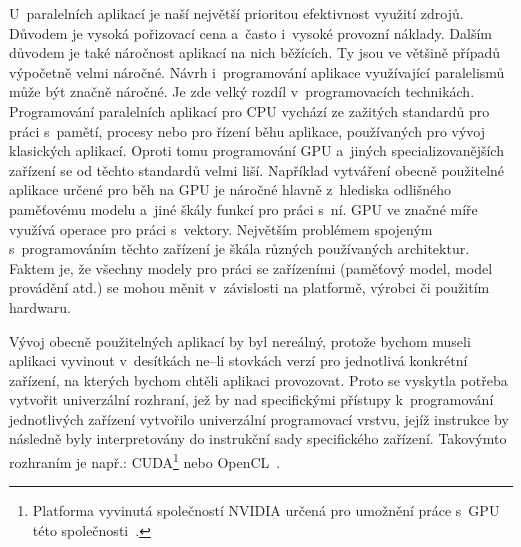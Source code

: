  U~paralelních aplikací je naší největší prioritou efektivnost využití zdrojů. Důvodem je
vysoká pořizovací cena a~často i~vysoké provozní náklady. Dalším důvodem je také náročnost aplikací
na nich běžících. Ty jsou ve většině případů výpočetně velmi náročné. Návrh i~programování aplikace
využívající paralelismů může být značně náročné. Je zde velký rozdíl v~programovacích technikách.
Programování paralelních aplikací pro CPU vychází ze zažitých standardů pro práci s~pamětí,
procesy nebo pro řízení běhu aplikace, používaných pro vývoj klasických aplikací. Oproti tomu
programování GPU a~jiných specializovanějších zařízení se od těchto standardů velmi liší.
Například vytváření obecně použitelné aplikace určené pro běh na GPU je náročné hlavně z~hlediska
odlišného paměťovému modelu a~jiné škály funkcí pro práci s~ní. GPU ve značné míře využívá
operace pro práci s~vektory. Největším problémem spojeným s~programováním těchto zařízení je škála
různých používaných architektur. Faktem je, že všechny modely pro práci se zařízeními (paměťový
model, model provádění atd.) se mohou měnit v~závislosti na platformě, výrobci či použitím
hardwaru.

 Vývoj obecně použitelných aplikací by byl nereálný, protože bychom museli
aplikaci vyvinout v~desítkách ne--li stovkách verzí pro jednotlivá konkrétní zařízení, na kterých
bychom chtěli aplikaci provozovat. Proto se vyskytla potřeba vytvořit univerzální rozhraní, jež by
nad specifickými přístupy k~programování jednotlivých zařízení vytvořilo univerzální programovací
vrstvu, jejíž instrukce by následně byly interpretovány do instrukční sady specifického zařízení.
Takovýmto rozhraním je např.: CUDA\footnote{Platforma vyvinutá společností NVIDIA určená pro
umožnění práce s~GPU této společnosti~\cite{NVIDIA}.} nebo OpenCL~\cite{AMD:2011}.

